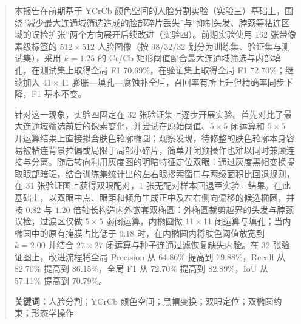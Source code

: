 \documentclass{SYSUReport}
\date{2026 年 11 月 9 日}
\begin{document}
\hypersetup{pageanchor=false}
\cover
\thispagestyle{empty}
\clearpage
{}
\hypersetup{pageanchor=true}

\begin{abstract}
本报告在前期基于 YCrCb 颜色空间的人脸分割实验（实验三）基础上，围绕“减少最大连通域筛选造成的脸部碎片丢失”与“抑制头发、脖颈等粘连区域的误检扩张”两个方向展开后续改进（实验四）。前期实验使用 162 张带像素级标签的 $512\times512$ 人脸图像（按 98/32/32 划分为训练集、验证集与测试集），采用 $k=1.25$ 的 Cr/Cb 矩形阈值配合最大连通域筛选与内部填孔，在测试集上取得全局 F1 70.69\%，在验证集上取得全局 F1 72.70\%；继续加入 $41\times41$ 膨胀—填孔—腐蚀补全后，召回率有所上升但精确率同步下降，F1 基本不变。

针对这一现象，实验四固定在 32 张验证集上逐步开展实验。首先对比了最大连通域筛选前后的像素变化，并尝试在原始阈值、$5\times5$ 闭运算和 $5\times5$ 开运算结果上直接拟合肤色轮廓椭圆；观察发现，待修整的肤色轮廓本身容易被粘连背景拉偏或局限于局部小碎片，简单开闭预操作也难以同时兼顾连接与分离。随后转向利用灰度图的明暗特征定位双眼：通过灰度黑帽变换提取眼部暗斑，结合训练集统计出的左右眼搜索窗口与两级面积比回退规则，在 31 张验证图上获得双眼配对，1 张无配对样本回退至实验三结果。在此基础上，以双眼中点、眼距和倾角生成正中及左右侧向偏移的候选椭圆，并按 $0.82$ 与 $1.20$ 倍轴长构造内外嵌套双椭圆：外椭圆裁剪越界的头发与脖颈误检，过渡区仅做 $5\times5$ 弱闭运算，内椭圆做 $11\times11$ 闭运算与填孔；当内椭圆中的原有掩膜占比低于 $0.18$ 时，在内椭圆内将肤色阈值放宽到 $k=2.00$ 并结合 $27\times27$ 闭运算与种子连通过滤恢复缺失内脸。在 32 张验证图上，改进流程将全局 Precision 从 64.86\% 提高到 79.88\%，Recall 从 82.70\% 提高到 86.15\%，全局 F1 从 72.70\% 提高到 82.89\%，IoU 从 57.11\% 提高到 70.79\%。

\noindent\textbf{关键词：}人脸分割；YCrCb 颜色空间；黑帽变换；双眼定位；双椭圆约束；形态学操作
\end{abstract}

\clearpage
\tableofcontents
\clearpage
{}


\FloatBarrier

\FloatBarrier

\FloatBarrier

\FloatBarrier

\FloatBarrier

\FloatBarrier

\FloatBarrier
\end{document}
